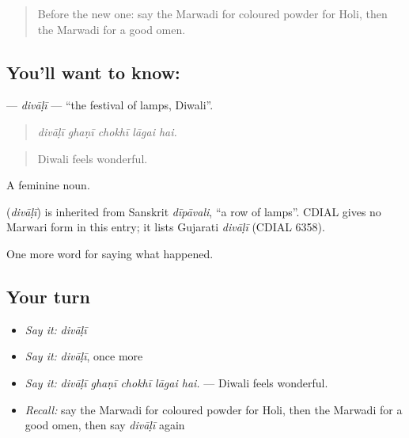 \label{lesson:MW-C249-divali}



\begin{quote}
Before the new one: say the Marwadi for coloured powder for Holi, then the Marwadi for a good omen.
\end{quote}

\subsection*{You'll want to know: }
\textbf{} — \emph{divāḷī} — \textquotedblleft{}the festival of lamps, Diwali\textquotedblright{}.

\begin{quote}
    
\end{quote}

\begin{quote}
\emph{divāḷī ghaṇī chokhī lāgai hai.}
\end{quote}

\begin{quote}
Diwali feels wonderful.
\end{quote}

A feminine noun.

\begin{cousinweb}
\textbf{} (\emph{divāḷī}) is inherited from Sanskrit \emph{dīpāvali}, \textquotedblleft{}a row of lamps\textquotedblright{}. CDIAL gives no Marwari form in this entry; it lists Gujarati \emph{divāḷī} (CDIAL 6358).
\end{cousinweb}

\begin{grammarlens}[title={What you've built}]
One more word for saying what happened.
\end{grammarlens}

\subsection*{Your turn}
\begin{itemize}
\raggedright
  \item \emph{Say it:} \emph{divāḷī}
  \item \emph{Say it:} \emph{divāḷī}, once more
  \item \emph{Say it:} \emph{divāḷī ghaṇī chokhī lāgai hai.} — Diwali feels wonderful.
  \item \emph{Recall:} say the Marwadi for coloured powder for Holi, then the Marwadi for a good omen, then say \emph{divāḷī} again
\end{itemize}

